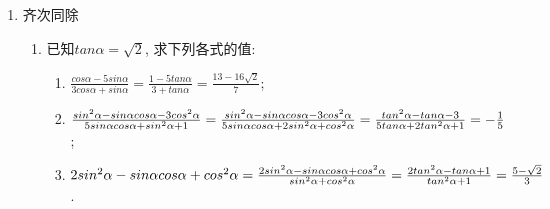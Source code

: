 \begin{enumerate}
\begin{enumerate}
        \item 设$y= sin\alpha\cdot cos\alpha\cdot cot\alpha$, 且$\alpha$是象限角, 则$y$的符号为\dotfill()
        \item 已知$\theta\in\left(0,\frac{\pi}{2}\right)$, 且$\log_{ tan\theta+ cot\theta} sin\theta=-\frac{3}{4}$, 
        则$\log_{ tan\theta} cos\theta=$.
        \begin{jieda}
        $( tan\theta+ cot\theta)^{-\frac{3}{4}} =(\frac{sin\theta}{cos\theta} + \frac{cos\theta}{sin\theta})^{-\frac{3}{4}} = (\frac{1}{sin\theta cos\theta})^{-\frac{3}{4}} = sin\theta$，即$sin\theta = cos^3\theta$. 故$ cos^2\theta= tan\theta$, 所以$\log_{ tan\theta} cos\theta=\frac{1}{2}$. 
        \end{jieda}
    \end{enumerate}
    \item 齐次同除
    \begin{enumerate}
        \item 已知$tan\alpha=\sqrt{2}$, 求下列各式的值: \\
        \begin{jieda}
        \begin{enumerate}[1.]
        \item $\frac{cos\alpha-5sin\alpha}{3cos\alpha+sin\alpha} = \frac{1-5tan\alpha}{3+tan\alpha} = \frac{13-16\sqrt2}{7}$; 
        \item $\frac{sin^2\alpha-sin\alpha cos\alpha-3cos^2\alpha}{5sin\alpha cos\alpha+sin^2\alpha+1} = \frac{sin^2\alpha-sin\alpha cos\alpha-3cos^2\alpha}{5sin\alpha cos\alpha+2sin^2\alpha+cos^2\alpha} \\
        = \frac{tan^2\alpha-tan\alpha -3}{5 tan\alpha+2tan^2\alpha + 1} = -\frac{1}{5}$; 
        \item $2sin^2\alpha-sin\alpha cos\alpha+cos^2\alpha = \frac{2sin^2\alpha-sin\alpha cos\alpha+cos^2\alpha}{sin^2\alpha + cos^2\alpha} \\
        = \frac{2tan^2\alpha-tan\alpha+1}{tan^2\alpha + 1} = \frac{5-\sqrt{2}}{3}$. 

\end{enumerate}
\end{jieda}
\end{enumerate}
\end{enumerate}
